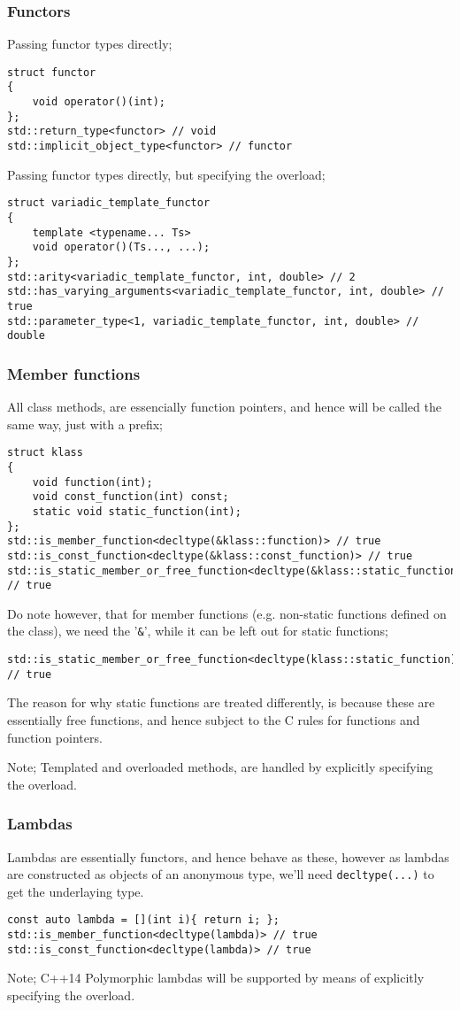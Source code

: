 \subsubsection{Functors}
Passing functor types directly;
\begin{verbatim}
struct functor
{
    void operator()(int);
};
std::return_type<functor> // void
std::implicit_object_type<functor> // functor
\end{verbatim}
Passing functor types directly, but specifying the overload;
\begin{verbatim}
struct variadic_template_functor
{
    template <typename... Ts>
    void operator()(Ts..., ...);
};
std::arity<variadic_template_functor, int, double> // 2
std::has_varying_arguments<variadic_template_functor, int, double> // true
std::parameter_type<1, variadic_template_functor, int, double> // double
\end{verbatim}

\subsubsection{Member functions}
All class methods, are essencially function pointers, and hence will be called
the same way, just with a prefix;
\begin{verbatim}
struct klass
{
    void function(int);
    void const_function(int) const;
    static void static_function(int);
};
std::is_member_function<decltype(&klass::function)> // true
std::is_const_function<decltype(&klass::const_function)> // true
std::is_static_member_or_free_function<decltype(&klass::static_function)> // true
\end{verbatim}
Do note however, that for member functions (e.g. non-static functions defined on
the class), we need the '\verb|&|', while it can be left out for static functions;
\begin{verbatim}
std::is_static_member_or_free_function<decltype(klass::static_function)> // true
\end{verbatim}
The reason for why static functions are treated differently, is because these
are essentially free functions, and hence subject to the C rules for functions
and function pointers. 

Note; Templated and overloaded methods, are handled by explicitly specifying the
overload.

\subsubsection{Lambdas}
Lambdas are essentially functors, and hence behave as these, however as lambdas
are constructed as objects of an anonymous type, we'll need \verb|decltype(...)|
to get the underlaying type.
\begin{verbatim}
const auto lambda = [](int i){ return i; };
std::is_member_function<decltype(lambda)> // true
std::is_const_function<decltype(lambda)> // true
\end{verbatim}
Note; C++14 Polymorphic lambdas will be supported by means of explicitly specifying the
overload.

